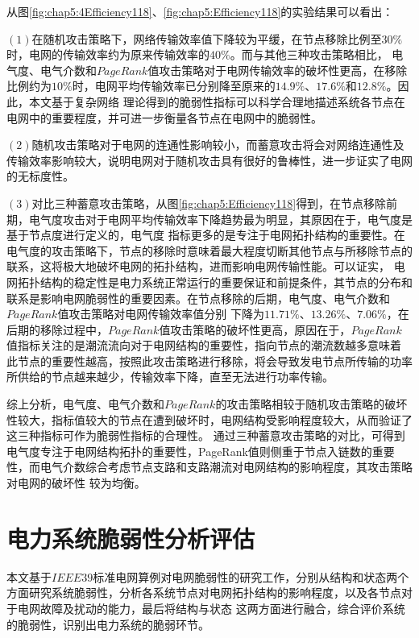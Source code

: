 从图\ref{fig:chap5:4Efficiency118}、\ref{fig:chap5:Efficiency118}的实验结果可以看出：

$(1)$在随机攻击策略下，网络传输效率值下降较为平缓，在节点移除比例至$30\%$时，电网的传输效率约为原来传输效率的$40\%$。而与其他三种攻击策略相比，
电气度、电气介数和$PageRank$值攻击策略对于电网传输效率的破坏性更高，在移除比例约为$10\%$时，电网平均传输效率已分别降至原来的$14.9\%$、$17.6\%$和$12.8\%$。因此，本文基于复杂网络
理论得到的脆弱性指标可以科学合理地描述系统各节点在电网中的重要程度，并可进一步衡量各节点在电网中的脆弱性。

$(2)$随机攻击策略对于电网的连通性影响较小，而蓄意攻击将会对网络连通性及传输效率影响较大，说明电网对于随机攻击具有很好的鲁棒性，进一步证实了电网的无标度性。

$(3)$对比三种蓄意攻击策略，从图\ref{fig:chap5:Efficiency118}得到，在节点移除前期，电气度攻击对于电网平均传输效率下降趋势最为明显，其原因在于，电气度是基于节点度进行定义的，电气度
指标更多的是专注于电网拓扑结构的重要性。在电气度的攻击策略下，节点的移除时意味着最大程度切断其他节点与所移除节点的联系，这将极大地破坏电网的拓扑结构，进而影响电网传输性能。可以证实，
电网拓扑结构的稳定性是电力系统正常运行的重要保证和前提条件，其节点的分布和联系是影响电网脆弱性的重要因素。在节点移除的后期，电气度、电气介数和$PageRank$值攻击策略对电网传输效率值分别
下降为$11.71\%$、$13.26\%$、$7.06\%$，在后期的移除过程中，$PageRank$值攻击策略的破坏性更高，原因在于，$PageRank$值指标关注的是潮流流向对于电网结构的重要性，指向节点的潮流数越多意味着
此节点的重要性越高，按照此攻击策略进行移除，将会导致发电节点所传输的功率所供给的节点越来越少，传输效率下降，直至无法进行功率传输。

综上分析，电气度、电气介数和$PageRank$的攻击策略相较于随机攻击策略的破坏性较大，指标值较大的节点在遭到破坏时，电网结构受影响程度较大，从而验证了这三种指标可作为脆弱性指标的合理性。
通过三种蓄意攻击策略的对比，可得到电气度专注于电网结构拓扑的重要性，PageRank值则侧重于节点入链数的重要性，而电气介数综合考虑节点支路和支路潮流对电网结构的影响程度，其攻击策略对电网的破坏性
较为均衡。


\section{电力系统脆弱性分析评估}
\label{sec:singleAssessment}

本文基于$IEEE39$标准电网算例对电网脆弱性的研究工作，分别从结构和状态两个方面研究系统脆弱性，分析各系统节点对电网拓扑结构的影响程度，以及各节点对于电网故障及扰动的能力，最后将结构与状态
这两方面进行融合，综合评价系统的脆弱性，识别出电力系统的脆弱环节。

